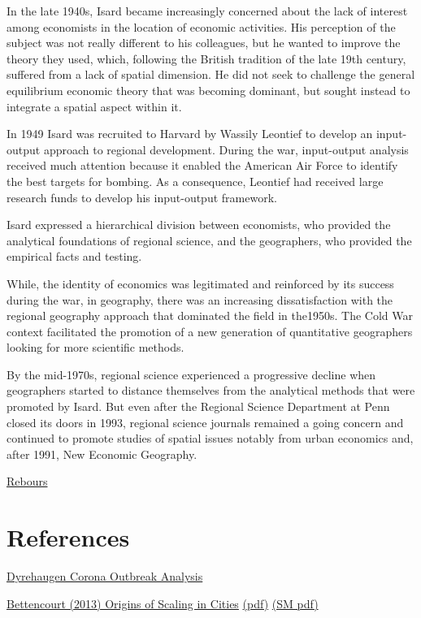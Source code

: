 \documentclass[
]{book}
\begin{document}
In the late 1940s, Isard became increasingly concerned about the lack of interest among economists in the location of economic activities. His perception of the subject was not really different to his colleagues, but he wanted to improve the theory they used, which, following the British tradition of the late 19th century, suffered from a lack of spatial dimension. He did not seek to challenge the general equilibrium economic theory that was becoming dominant, but sought instead to integrate a spatial aspect within it.

In 1949 Isard was recruited to Harvard by Wassily Leontief to develop an input-output approach to regional development. During the war, input-output analysis received much attention because it enabled the American Air Force to identify the best targets for bombing. As a consequence, Leontief had received large research funds to develop his input-output framework.

Isard expressed a hierarchical division between economists, who provided
the analytical foundations of regional science,
and the geographers, who provided the empirical facts and testing.

While, the identity of economics was legitimated and reinforced by its success during the war, in geography, there was an increasing dissatisfaction with the regional geography approach that dominated the field in the1950s. The Cold War context facilitated the promotion of a new generation of quantitative geographers looking for more scientific methods.

By the mid-1970s, regional science experienced a progressive decline when geographers started to distance themselves from the analytical methods that were promoted by Isard. But even after the Regional Science Department at Penn closed its doors in 1993, regional science journals remained a going concern and continued to promote studies of spatial issues notably from urban economics and, after 1991, New Economic Geography.

\href{https://hscif.org/economists-in-the-city-rebours/}{Rebours}

\hypertarget{references}{%
\chapter{References}\label{references}}

\href{https://dyrehaugen.github.io/jdt/coronaanalysis.html}{Dyrehaugen Corona Outbreak Analysis}

\href{https://science.sciencemag.org/content/340/6139/1438}{Bettencourt (2013) Origins of Scaling in Cities}
\href{/Bettencourt_2013_Origins_of_Scaling_in_Cities.pdf}{(pdf)}
\href{/Bettencourt_2013_Origins_of_Scaling_in_Cities_SM.pdf}{(SM pdf)}
\end{document}
